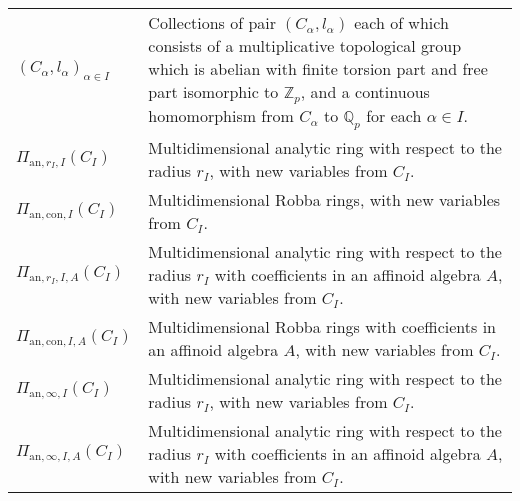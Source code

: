 \documentclass[12pt]{amsart}
\theoremstyle{definition}
\numberwithin{equation}{section}
\begin{document}
\begin{center}
\begin{tabularx}{\linewidth}{lX}
$(C_\alpha,l_\alpha)_{\alpha\in I}$  & Collections of pair $(C_\alpha,l_\alpha)$ each of which consists of a multiplicative topological group which is abelian with finite torsion part and free part isomorphic to $\mathbb{Z}_p$, and a continuous homomorphism from $C_\alpha$ to $\mathbb{Q}_p$ for each $\alpha\in I$.  \\
$\Pi_{\mathrm{an},r_I,I}(C_I)$ & Multidimensional analytic ring with respect to the radius $r_{I}$, with new variables from $C_I$.\\
$\Pi_{\mathrm{an},\mathrm{con},I}(C_I)$ & Multidimensional Robba rings, with new variables from $C_I$.\\ 	
$\Pi_{\mathrm{an},r_I,I,A}(C_I)$ & Multidimensional analytic ring with respect to the radius $r_{I}$ with coefficients in an affinoid algebra $A$, with new variables from $C_I$.\\
$\Pi_{\mathrm{an},\mathrm{con},I,A}(C_I)$ & Multidimensional Robba rings with coefficients in an affinoid algebra $A$, with new variables from $C_I$.\\ 	
$\Pi_{\mathrm{an},\infty,I}(C_I)$ & Multidimensional analytic ring with respect to the radius $r_{I}$, with new variables from $C_I$.\\
$\Pi_{\mathrm{an},\infty,I,A}(C_I)$ & Multidimensional analytic ring with respect to the radius $r_{I}$ with coefficients in an affinoid algebra $A$, with new variables from $C_I$.\\


\end{tabularx}
\end{center}
\end{document}
